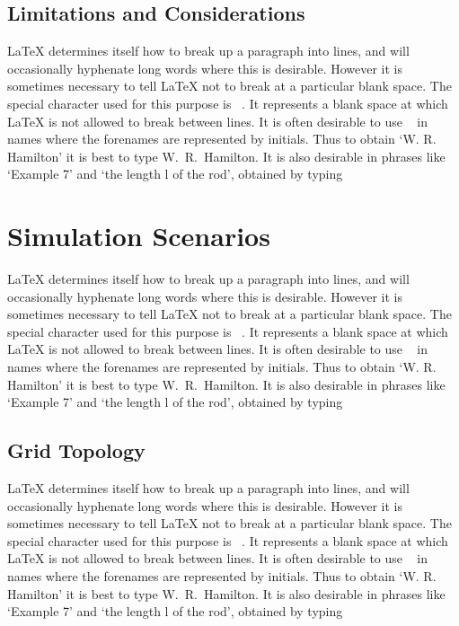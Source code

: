 \documentclass[12pt]{report}
\begin{document}
\subsection{Limitations and Considerations}

LaTeX determines itself how to break up a paragraph into lines, and will occasionally hyphenate long words where this is desirable. However it is sometimes necessary to tell LaTeX not to break at a particular blank space. The special character used for this purpose is ~. It represents a blank space at which LaTeX is not allowed to break between lines. It is often desirable to use ~ in names where the forenames are represented by initials. Thus to obtain `W. R. Hamilton' it is best to type W.~R.~Hamilton. It is also desirable in phrases like `Example 7' and `the length l of the rod', obtained by typing



\section{Simulation Scenarios}

LaTeX determines itself how to break up a paragraph into lines, and will occasionally hyphenate long words where this is desirable. However it is sometimes necessary to tell LaTeX not to break at a particular blank space. The special character used for this purpose is ~. It represents a blank space at which LaTeX is not allowed to break between lines. It is often desirable to use ~ in names where the forenames are represented by initials. Thus to obtain `W. R. Hamilton' it is best to type W.~R.~Hamilton. It is also desirable in phrases like `Example 7' and `the length l of the rod', obtained by typing



\subsection{Grid Topology}

LaTeX determines itself how to break up a paragraph into lines, and will occasionally hyphenate long words where this is desirable. However it is sometimes necessary to tell LaTeX not to break at a particular blank space. The special character used for this purpose is ~. It represents a blank space at which LaTeX is not allowed to break between lines. It is often desirable to use ~ in names where the forenames are represented by initials. Thus to obtain `W. R. Hamilton' it is best to type W.~R.~Hamilton. It is also desirable in phrases like `Example 7' and `the length l of the rod', obtained by typing
\end{document}
